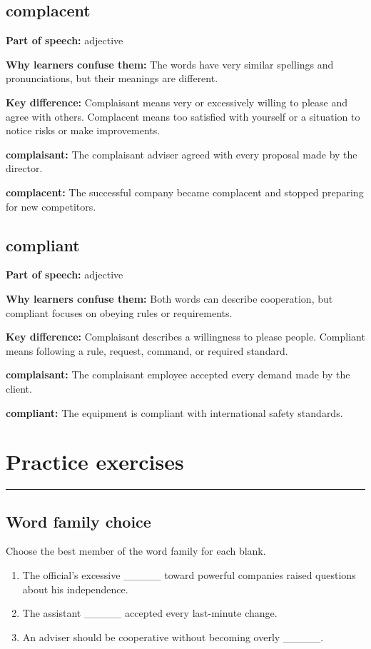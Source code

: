 \documentclass[11pt]{article}
\newcommand{\sectionrule}{\par\vspace{-0.5em}\noindent\textcolor{Accent}{\rule{\linewidth}{0.6pt}}\par}
\begin{document}
\subsection{complacent}
\textbf{Part of speech:} adjective

\textbf{Why learners confuse them:} The words have very similar spellings and pronunciations, but their meanings are different.

\textbf{Key difference:} Complaisant means very or excessively willing to please and agree with others. Complacent means too satisfied with yourself or a situation to notice risks or make improvements.

\textbf{complaisant:} The complaisant adviser agreed with every proposal made by the director.

\textbf{complacent:} The successful company became complacent and stopped preparing for new competitors.

\subsection{compliant}
\textbf{Part of speech:} adjective

\textbf{Why learners confuse them:} Both words can describe cooperation, but compliant focuses on obeying rules or requirements.

\textbf{Key difference:} Complaisant describes a willingness to please people. Compliant means following a rule, request, command, or required standard.

\textbf{complaisant:} The complaisant employee accepted every demand made by the client.

\textbf{compliant:} The equipment is compliant with international safety standards.

\section{Practice exercises}
\sectionrule
\subsection{Word family choice}
Choose the best member of the word family for each blank.

\begin{enumerate}
  \item The official's excessive \_\_\_\_\_ toward powerful companies raised questions about his independence.
  \item The assistant \_\_\_\_\_ accepted every last-minute change.
  \item An adviser should be cooperative without becoming overly \_\_\_\_\_.
\end{enumerate}
\end{document}
